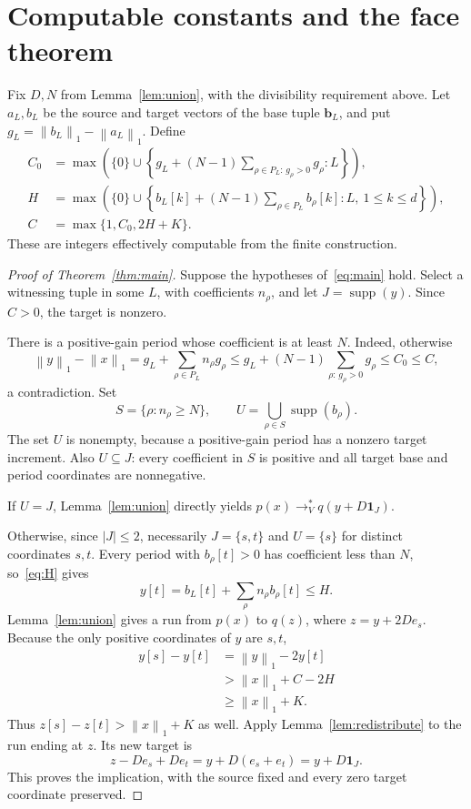 \documentclass[11pt,a4paper]{article}
\theoremstyle{remark}
\newcommand{\supp}{\operatorname{supp}}
\newcommand{\one}{\mathbf 1}
\newcommand{\norm}[1]{\left\lVert #1\right\rVert_1}
\newcommand{\reach}{\longrightarrow_V^*}
\begin{document}
\section{Computable constants and the face theorem}

Fix $D,N$ from Lemma~\ref{lem:union}, with the divisibility requirement above. Let $a_L,b_L$ be the source and target vectors of the base tuple $\mathbf b_L$, and put $g_L=\norm{b_L}-\norm{a_L}$. Define
\begin{align}
 C_0&=\max\left(\{0\}\cup
 \left\{g_L+(N-1)\sum_{\rho\in P_L:\,g_\rho>0}g_\rho:L\right\}\right),\label{eq:C0}\\
 H&=\max\left(\{0\}\cup
 \left\{b_L[k]+(N-1)\sum_{\rho\in P_L}b_\rho[k]:L,\ 1\le k\le d\right\}\right),\label{eq:H}\\
 C&=\max\{1,C_0,2H+K\}.\label{eq:C}
\end{align}
These are integers effectively computable from the finite construction.

\begin{proof}[Proof of Theorem~\ref{thm:main}]
Suppose the hypotheses of~\eqref{eq:main} hold. Select a witnessing tuple in some $L$, with coefficients $n_\rho$, and let $J=\supp(y)$. Since $C>0$, the target is nonzero.

There is a positive-gain period whose coefficient is at least $N$. Indeed, otherwise
\[
 \norm{y}-\norm{x}
 =g_L+\sum_{\rho\in P_L}n_\rho g_\rho
 \le g_L+(N-1)\sum_{\rho:\,g_\rho>0}g_\rho
 \le C_0\le C,
\]
a contradiction. Set
\[
 S=\{\rho:n_\rho\ge N\},\qquad U=\bigcup_{\rho\in S}\supp(b_\rho).
\]
The set $U$ is nonempty, because a positive-gain period has a nonzero target increment. Also $U\subseteq J$: every coefficient in $S$ is positive and all target base and period coordinates are nonnegative.

If $U=J$, Lemma~\ref{lem:union} directly yields $p(x)\reach q(y+D\one_J)$.

Otherwise, since $|J|\le2$, necessarily $J=\{s,t\}$ and $U=\{s\}$ for distinct coordinates $s,t$. Every period with $b_\rho[t]>0$ has coefficient less than $N$, so~\eqref{eq:H} gives
\begin{equation}\label{eq:small}
 y[t]=b_L[t]+\sum_{\rho}n_\rho b_\rho[t]\le H.
\end{equation}
Lemma~\ref{lem:union} gives a run from $p(x)$ to $q(z)$, where $z=y+2De_s$. Because the only positive coordinates of $y$ are $s,t$,
\[
 \begin{aligned}
 y[s]-y[t]
 &=\norm{y}-2y[t]\\
 &>\norm{x}+C-2H\\
 &\ge\norm{x}+K.
 \end{aligned}
\]
Thus $z[s]-z[t]>\norm{x}+K$ as well. Apply Lemma~\ref{lem:redistribute} to the run ending at $z$. Its new target is
\[
 z-De_s+De_t=y+D(e_s+e_t)=y+D\one_J.
\]
This proves the implication, with the source fixed and every zero target coordinate preserved.
\end{proof}
\end{document}
